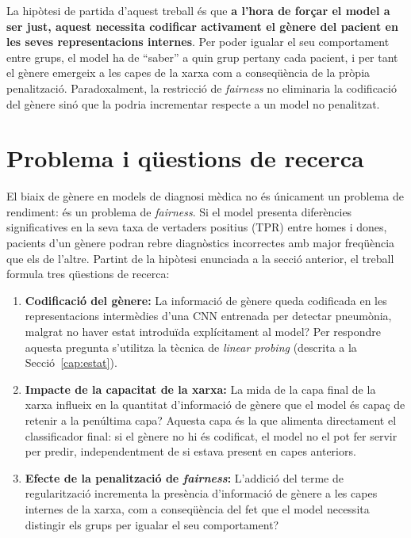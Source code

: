 \documentclass[a4paper,12pt,twoside]{ThesisStyle}
\begin{document}
La hipòtesi de partida d'aquest treball és que \textbf{a l'hora de forçar el model a ser just, aquest necessita codificar activament el gènere del pacient en les seves representacions internes}. Per poder igualar el seu comportament entre grups, el model ha de ``saber'' a quin grup pertany cada pacient, i per tant el gènere emergeix a les capes de la xarxa com a conseqüència de la pròpia penalització. Paradoxalment, la restricció de \textit{fairness} no eliminaria la codificació del gènere sinó que la podria incrementar respecte a un model no penalitzat.

\section{Problema i qüestions de recerca}

El biaix de gènere en models de diagnosi mèdica no és únicament un problema de rendiment: és un problema de \textit{fairness}. Si el model presenta diferències significatives en la seva taxa de vertaders positius (TPR) entre homes i dones, pacients d'un gènere podran rebre diagnòstics incorrectes amb major freqüència que els de l'altre. Partint de la hipòtesi enunciada a la secció anterior, el treball formula tres qüestions de recerca:

\begin{enumerate}
    \item \textbf{Codificació del gènere:} La informació de gènere queda codificada en les representacions intermèdies d'una CNN entrenada per detectar pneumònia, malgrat no haver estat introduïda explícitament al model? Per respondre aquesta pregunta s'utilitza la tècnica de \textit{linear probing} (descrita a la Secció~\ref{cap:estat}).
    \item \textbf{Impacte de la capacitat de la xarxa:} La mida de la capa final de la xarxa influeix en la quantitat d'informació de gènere que el model és capaç de retenir a la penúltima capa? Aquesta capa és la que alimenta directament el classificador final: si el gènere no hi és codificat, el model no el pot fer servir per predir, independentment de si estava present en capes anteriors.
    \item \textbf{Efecte de la penalització de \textit{fairness}:} L'addició del terme de regularització incrementa la presència d'informació de gènere a les capes internes de la xarxa, com a conseqüència del fet que el model necessita distingir els grups per igualar el seu comportament?
\end{enumerate}
\end{document}
